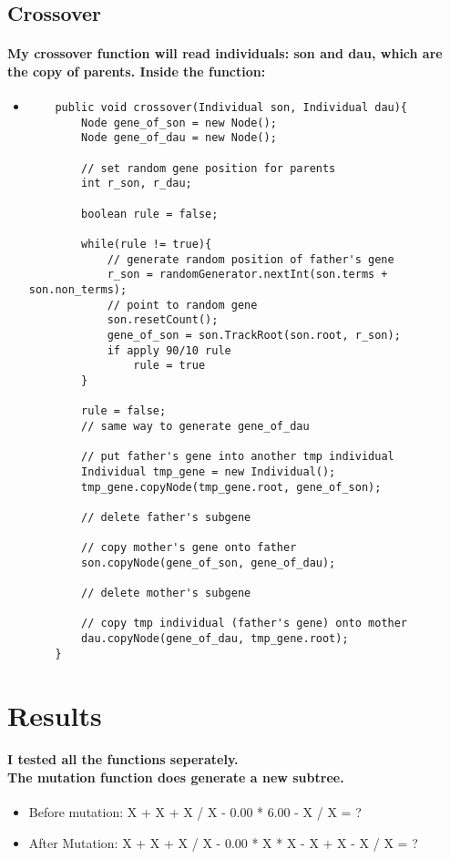 \documentclass[12pt]{article}
\begin{document}
	\subsection{Crossover}
	\paragraph{My crossover function will read individuals: son and dau, which are the copy of parents. Inside the function:}
	\begin{itemize}
	\item
	\begin{lstlisting}
    public void crossover(Individual son, Individual dau){
        Node gene_of_son = new Node();
        Node gene_of_dau = new Node();
        
        // set random gene position for parents
        int r_son, r_dau;
        
        boolean rule = false;
        
        while(rule != true){
            // generate random position of father's gene
            r_son = randomGenerator.nextInt(son.terms + son.non_terms);
            // point to random gene
            son.resetCount();
            gene_of_son = son.TrackRoot(son.root, r_son);
            if apply 90/10 rule
            	rule = true
        }
        
        rule = false;
        // same way to generate gene_of_dau
        
        // put father's gene into another tmp individual
        Individual tmp_gene = new Individual();
        tmp_gene.copyNode(tmp_gene.root, gene_of_son);
        
        // delete father's subgene
        
        // copy mother's gene onto father
        son.copyNode(gene_of_son, gene_of_dau);
        
        // delete mother's subgene
        
        // copy tmp individual (father's gene) onto mother
        dau.copyNode(gene_of_dau, tmp_gene.root);
    }
	\end{lstlisting}
	\end{itemize}
	
\section{Results}
\paragraph{I tested all the functions seperately. \\The mutation function does generate a new subtree.}
\begin{itemize}
\item Before mutation: X + X + X / X - 0.00 * 6.00 - X / X = ?
\item After Mutation: X + X + X / X - 0.00 * X * X - X + X - X / X = ?
\end{itemize}
\end{document}
